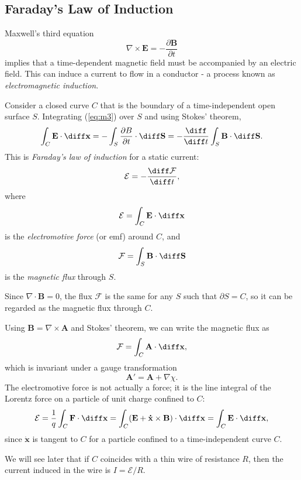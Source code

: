 \documentclass[12pt]{article}
\begin{document}
\subsection{Faraday's Law of Induction}
\label{sub:faradays_law_of_induction}

Maxwell's third equation
\[
	\nabla \times \mathbf{E} = - \frac{\partial \mathbf{B}}{\partial t} \tag{M3}\label{eq:m3}
\]
implies that a time-dependent magnetic field must be accompanied by an electric field. This can induce a current to flow in a conductor - a process known as \emph{electromagnetic induction}.

Consider a closed curve $C$ that is the boundary of a time-independent open surface $S$. Integrating (\ref{eq:m3}) over $S$ and using Stokes' theorem,
\[
\int_{C} \mathbf{E} \cdot \diff \mathbf{x} = - \int_{S} \frac{\partial B}{\partial t} \cdot \diff \mathbf{S} = - \frac{\diff}{\diff t} \int_{S} \mathbf{B} \cdot \diff \mathbf{S}
.\]
This is \emph{Faraday's law of induction} for a static current:
\[
\mathcal{E} = - \frac{\diff \mathcal{F}}{\diff t}
,\]
where
\[
\mathcal{E} = \int_{C} \mathbf{E} \cdot \diff \mathbf{x}
\]
is the \emph{electromotive force} (or emf) around $C$, and
\[
\mathcal{F} = \int_{S} \mathbf{B} \cdot \diff \mathbf{S}
\]
is the \emph{magnetic flux} through $S$.

Since $\nabla \cdot \mathbf{B} = 0$, the flux $\mathcal{F}$ is the same for any $S$ such that $\partial S = C$, so it can be regarded as the magnetic flux through $C$.

Using $\mathbf{B} = \nabla \times \mathbf{A}$ and Stokes' theorem, we can write the magnetic flux as
\[
\mathcal{F} = \int_{C} \mathbf{A} \cdot \diff \mathbf{x}
,\]
which is invariant under a gauge transformation
\[
\mathbf{A}' = \mathbf{A} + \nabla \chi
.\]
The electromotive force is not actually a force; it is the line integral of the Lorentz force on a particle of unit charge confined to $C$:
\[
\mathcal{E} = \frac{1}{q} \int_{C} \mathbf{F} \cdot \diff \mathbf{x} = \int_{C}(\mathbf{E} + \mathbf{\dot x} \times \mathbf{B}) \cdot \diff \mathbf{x} = \int_{C} \mathbf{E} \cdot \diff \mathbf{x}
,\]
since $\mathbf{\dot x}$ is tangent to $C$ for a particle confined to a time-independent curve $C$.

We will see later that if $C$ coincides with a thin wire of resistance $R$, then the current induced in the wire is $I = \mathcal{E}/R$.
\end{document}
